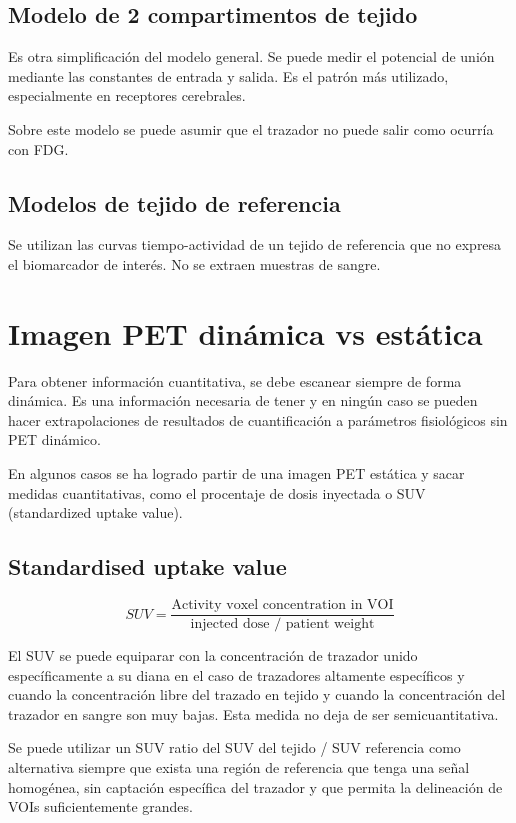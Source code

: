 \subsection{Modelo de 2 compartimentos de tejido}
Es otra simplificación del modelo general. Se puede medir el potencial de unión mediante las constantes de entrada y salida. Es el patrón más utilizado, especialmente en receptores cerebrales. 

Sobre este modelo se puede asumir que el trazador no puede salir como ocurría con FDG.

\subsection{Modelos de tejido de referencia}
Se utilizan las curvas tiempo-actividad de un tejido de referencia que no expresa el biomarcador de interés. No se extraen muestras de sangre.

\section{Imagen PET dinámica vs estática}
Para obtener información cuantitativa, se debe escanear siempre de forma dinámica. Es una información necesaria de tener y en ningún caso se pueden hacer extrapolaciones de resultados de cuantificación a parámetros fisiológicos sin PET dinámico.

En algunos casos se ha logrado partir de una imagen PET estática y sacar medidas cuantitativas, como el procentaje de dosis inyectada o SUV (standardized uptake value).

\subsection{Standardised uptake value}
$$SUV = \frac{\text{Activity voxel concentration in VOI}}{\text{injected dose / patient weight}}$$

El SUV se puede equiparar con la concentración de trazador unido específicamente a su diana en el caso de trazadores altamente específicos y cuando la concentración libre del trazado en tejido y cuando la concentración del trazador en sangre son muy bajas. Esta medida no deja de ser semicuantitativa.

Se puede utilizar un SUV ratio del SUV del tejido / SUV referencia como alternativa siempre que exista una región de referencia que tenga una señal homogénea, sin captación específica del trazador y que permita la delineación de VOIs suficientemente grandes.

